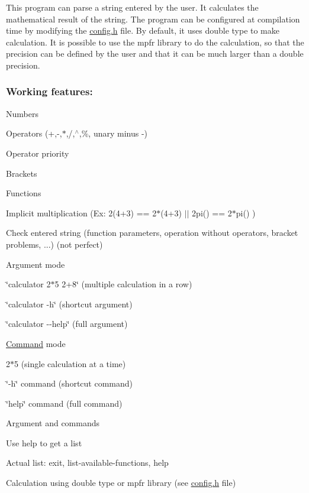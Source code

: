 This program can parse a string entered by the user. It calculates the mathematical result of the string. The program can be configured at compilation time by modifying the \hyperlink{config_8h}{config.\+h} file. By default, it uses double type to make calculation. It is possible to use the mpfr library to do the calculation, so that the precision can be defined by the user and that it can be much larger than a double precision.

\subsubsection*{Working features\+:}


\begin{DoxyItemize}
\item Numbers
\item Operators (+,-\/,$\ast$,/,$^\wedge$,\%, unary minus -\/)
\item Operator priority
\item Brackets
\item Functions
\item Implicit multiplication (Ex\+: 2(4+3) == 2$\ast$(4+3) $\vert$$\vert$ 2pi() == 2$\ast$pi() )
\item Check entered string (function parameters, operation without operators, bracket problems, ...) (not perfect)
\item Argument mode
\begin{DoxyItemize}
\item \char`\"{}calculator 2$\ast$5 2+8\char`\"{} (multiple calculation in a row)
\item \char`\"{}calculator -\/h\char`\"{} (shortcut argument)
\item \char`\"{}calculator -\/-\/help\char`\"{} (full argument)
\end{DoxyItemize}
\item \hyperlink{class_command}{Command} mode
\begin{DoxyItemize}
\item 2$\ast$5 (single calculation at a time)
\item \char`\"{}-\/h\char`\"{} command (shortcut command)
\item \char`\"{}help\char`\"{} command (full command)
\end{DoxyItemize}
\item Argument and commands
\begin{DoxyItemize}
\item Use help to get a list
\item Actual list\+: exit, list-\/available-\/functions, help
\end{DoxyItemize}
\item Calculation using double type or mpfr library (see \hyperlink{config_8h}{config.\+h} file)
\end{DoxyItemize}

